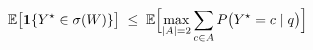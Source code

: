 \documentclass[border=2pt]{standalone}
\begin{document}
$\displaystyle \mathbb{E}\bigl[\mathbf{1}\{Y^\star \in \sigma(W)\}\bigr] \;\le\; \mathbb{E}\Bigl[\max_{|A|=2}\sum_{c \in A} P\bigl(Y^\star = c \mid q\bigr)\Bigr]$
\end{document}
